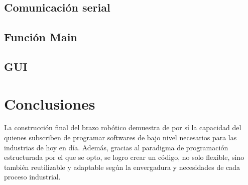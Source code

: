 \subsection{Comunicación serial}


\subsection{Función Main}


\subsection{GUI}

%
\section{Conclusiones}
La construcción final del brazo robótico demuestra de por sí la capacidad 
del quienes subscriben de programar softwares de bajo nivel necesarios para las industrias de hoy en 
día. Además, gracias al paradigma de programación estructurada por el que se opto, se logro
crear un código, no solo flexible, sino también reutilizable y adaptable según
la envergadura y necesidades de cada proceso industrial. 

\nocite{atmega328Datasheet}
\nocite{bjarneC++}
\nocite{deitel}
\nocite{make}
\nocite{CProgramingMicro}
\nocite{ControlPerifericosPaina}
{}



